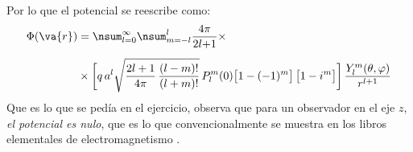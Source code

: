 Por lo que el potencial se reescribe como:
\begin{align}
\begin{aligned}
\Phi(\va{r}) &= \nsum_{l=0}^{\infty} \nsum_{m=-l}^{l} \dfrac{4 \pi}{2 l {+} 1} \times \\[0.5em]
&\times \bigg[ q \, a^{l} \sqrt{\dfrac{2 l + 1}{4 \pi} \, \dfrac{(l - m)!}{(l + m)!}} \, P_{l}^{m} (0) \big[ 1 - (-1)^{m} \big] \, \big[ 1 - i^{m} \big] \bigg] \, \dfrac{Y_{l}^{m}(\theta, \varphi)}{r^{l+1}}
\end{aligned}
\label{eq:ecuacion_12}
\end{align}
Que es lo que se pedía en el ejercicio, observa que para un observador en el eje $z$, \emph{el potencial es nulo},  que es lo que convencionalmente se muestra en los libros elementales de electromagnetismo .
